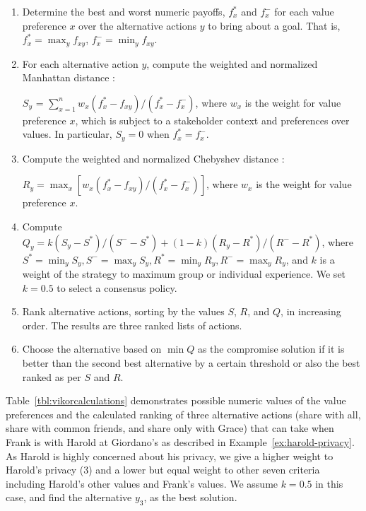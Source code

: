 \begin{enumerate}
\item Determine the best  and worst numeric payoffs, $f_x^*$ and $f_x^-$ for each value preference $x$ over the alternative actions $y$ to bring about a goal. That is, $f_x^* = {\max}_y f_{xy}$, $f_x^- = {\min}_y f_{xy}$.

\item For each alternative action $y$, compute the weighted and normalized Manhattan distance \citep{krause1973taxicab}:

$S_y$ = $\sum_{x=1}^{n} w_x(f_x^* - f_{xy})/(f_x^* - f_x^-)$, where $w_x$ is the weight for value preference $x$, which is subject to a stakeholder context and preferences over values. In particular, $S_y=0$ when $f_x^* = f_x^-$.

\item Compute the weighted and normalized Chebyshev distance \citep{cantrell2000modern}: 

$R_y ={\max}_x [w_x(f_x^* - f_{xy})/(f_x^* - f_x^-)]$, where $w_x$ is the weight for value preference $x$.

\item Compute $Q_y = k(S_y - S^*)/(S^- - S^*) + (1-k)(R_y - R^*)/(R^- - R^*)$, where $S^* = {\min}_y S_y, S^- = {\max}_y S_y, R^* = {\min}_y R_y, R^- = {\max}_y R_y$, and $k$ is a weight of the strategy to maximum group or individual experience. We set $k = 0.5$ to select a consensus policy. 

\item Rank alternative actions, sorting by the values $S$, $R$, and $Q$, in increasing order. The results are three ranked lists of actions. 

\item Choose the alternative based on $\min{Q}$ as the compromise solution if it is better than the second best alternative by a certain threshold or also the best ranked as per $S$ and $R$. 
\end{enumerate}

Table~\ref{tbl:vikorcalculations} demonstrates possible numeric values of the value preferences and the calculated ranking of three alternative actions (share with all, share with common friends, and share only with Grace) that \locationapp can take when Frank is with Harold at Giordano's as described in Example~\ref{ex:harold-privacy}. As Harold is highly concerned about his privacy, we give a higher weight to Harold's privacy (3) and a lower but equal weight to other seven criteria including Harold's other values and Frank's values. We assume $k=0.5$ in this case, and find the alternative $y_3$,  as the best solution.


